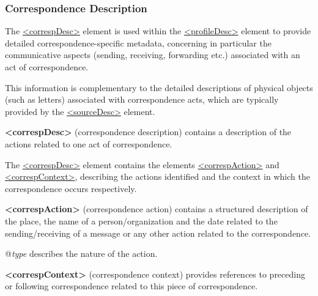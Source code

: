 \subsubsection[{Correspondence Description}]{Correspondence Description}\label{HD44CD}\par
The \hyperref[TEI.correspDesc]{<correspDesc>} element is used within the \hyperref[TEI.profileDesc]{<profileDesc>} element to provide detailed correspondence-specific metadata, concerning in particular the communicative aspects (sending, receiving, forwarding etc.) associated with an act of correspondence.\par
This information is complementary to the detailed descriptions of physical objects (such as letters) associated with correspondence acts, which are typically provided by the \hyperref[TEI.sourceDesc]{<sourceDesc>} element. 
\begin{sansreflist}
  
\item [\textbf{<correspDesc>}] (correspondence description) contains a description of the actions related to one act of correspondence.
\end{sansreflist}
\par
The \hyperref[TEI.correspDesc]{<correspDesc>} element contains the elements \hyperref[TEI.correspAction]{<correspAction>} and \hyperref[TEI.correspContext]{<correspContext>}, describing the actions identified and the context in which the correspondence occurs respectively. 
\begin{sansreflist}
  
\item [\textbf{<correspAction>}] (correspondence action) contains a structured description of the place, the name of a person/organization and the date related to the sending/receiving of a message or any other action related to the correspondence.\hfil\\[-10pt]\begin{sansreflist}
    \item[@{\itshape type}]
  describes the nature of the action.
\end{sansreflist}  
\item [\textbf{<correspContext>}] (correspondence context) provides references to preceding or following correspondence related to this piece of correspondence.
\end{sansreflist}
\par
